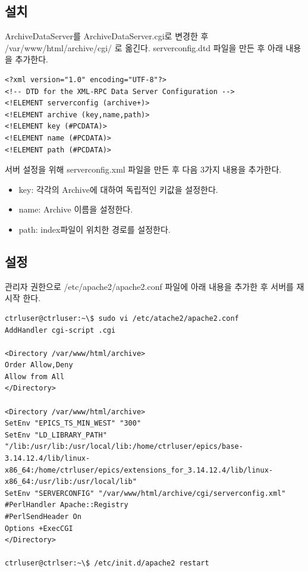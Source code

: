 \documentclass[11pt
  , a4paper
  , article
  , oneside
]{memoir}
\begin{document}
\subsection{설치}
ArchiveDataServer를 ArchiveDataServer.cgi로 변경한 후 /var/www/html/archive/cgi/ 로 옮긴다.
serverconfig.dtd 파일을 만든 후 아래 내용을 추가한다.
\begin{lstlisting}[style=termstyle]
<?xml version="1.0" encoding="UTF-8"?>
<!-- DTD for the XML-RPC Data Server Configuration -->
<!ELEMENT serverconfig (archive+)>
<!ELEMENT archive (key,name,path)>
<!ELEMENT key (#PCDATA)>
<!ELEMENT name (#PCDATA)>
<!ELEMENT path (#PCDATA)>
\end{lstlisting}
서버 설정을 위해 serverconfig.xml 파일을 만든 후 다음 3가지 내용을 추가한다.
\begin{itemize}
\item key: 각각의 Archive에 대하여 독립적인 키값을 설정한다.
\item name: Archive 이름을 설정한다.
\item path: index파일이 위치한 경로를 설정한다.
\end{itemize}

\subsection{설정}
관리자 권한으로 /etc/apache2/apache2.conf 파일에 아래 내용을 추가한 후 서버를 재시작 한다.
\begin{lstlisting}[style=termstyle]
ctrluser@ctrluser:~\$ sudo vi /etc/atache2/apache2.conf
AddHandler cgi-script .cgi

<Directory /var/www/html/archive>
Order Allow,Deny
Allow from All
</Directory>

<Directory /var/www/html/archive>
SetEnv "EPICS_TS_MIN_WEST" "300"
SetEnv "LD_LIBRARY_PATH" "/lib:/usr/lib:/usr/local/lib:/home/ctrluser/epics/base-3.14.12.4/lib/linux-x86_64:/home/ctrluser/epics/extensions_for_3.14.12.4/lib/linux-x86_64:/usr/lib:/usr/local/lib"
SetEnv "SERVERCONFIG" "/var/www/html/archive/cgi/serverconfig.xml"
#PerlHandler Apache::Registry
#PerlSendHeader On
Options +ExecCGI
</Directory>

ctrluser@ctrlser:~\$ /etc/init.d/apache2 restart

\end{lstlisting}
\end{document}
